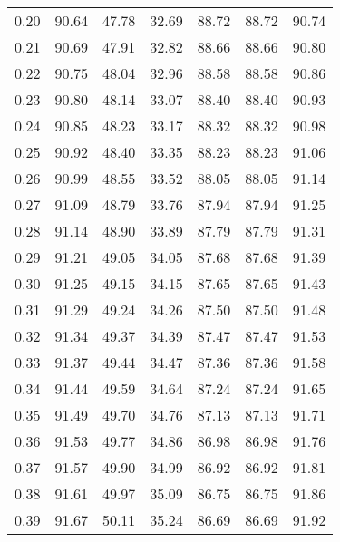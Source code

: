 \begin{tabular}{|c|c|c|c|c|c|c|}
      0.20 &     90.64 &     47.78 &      32.69 &   88.72 &      88.72 &         90.74 \\
      0.21 &     90.69 &     47.91 &      32.82 &   88.66 &      88.66 &         90.80 \\
      0.22 &     90.75 &     48.04 &      32.96 &   88.58 &      88.58 &         90.86 \\
      0.23 &     90.80 &     48.14 &      33.07 &   88.40 &      88.40 &         90.93 \\
      0.24 &     90.85 &     48.23 &      33.17 &   88.32 &      88.32 &         90.98 \\
      0.25 &     90.92 &     48.40 &      33.35 &   88.23 &      88.23 &         91.06 \\
      0.26 &     90.99 &     48.55 &      33.52 &   88.05 &      88.05 &         91.14 \\
      0.27 &     91.09 &     48.79 &      33.76 &   87.94 &      87.94 &         91.25 \\
      0.28 &     91.14 &     48.90 &      33.89 &   87.79 &      87.79 &         91.31 \\
      0.29 &     91.21 &     49.05 &      34.05 &   87.68 &      87.68 &         91.39 \\
      0.30 &     91.25 &     49.15 &      34.15 &   87.65 &      87.65 &         91.43 \\
      0.31 &     91.29 &     49.24 &      34.26 &   87.50 &      87.50 &         91.48 \\
      0.32 &     91.34 &     49.37 &      34.39 &   87.47 &      87.47 &         91.53 \\
      0.33 &     91.37 &     49.44 &      34.47 &   87.36 &      87.36 &         91.58 \\
      0.34 &     91.44 &     49.59 &      34.64 &   87.24 &      87.24 &         91.65 \\
      0.35 &     91.49 &     49.70 &      34.76 &   87.13 &      87.13 &         91.71 \\
      0.36 &     91.53 &     49.77 &      34.86 &   86.98 &      86.98 &         91.76 \\
      0.37 &     91.57 &     49.90 &      34.99 &   86.92 &      86.92 &         91.81 \\
      0.38 &     91.61 &     49.97 &      35.09 &   86.75 &      86.75 &         91.86 \\
      0.39 &     91.67 &     50.11 &      35.24 &   86.69 &      86.69 &         91.92 \\

\end{tabular}
